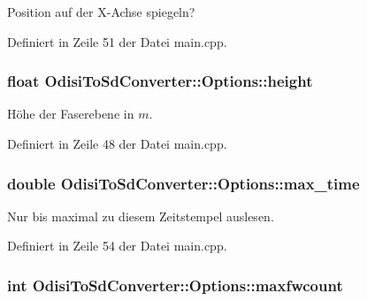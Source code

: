 Position auf der X-\/\-Achse spiegeln? 



Definiert in Zeile 51 der Datei main.\-cpp.

\hypertarget{structOdisiToSdConverter_1_1Options_a9e9609b45b425d128550508772ad69f6}{
\subsubsection[{height}]{\setlength{\rightskip}{0pt plus 5cm}float Odisi\-To\-Sd\-Converter\-::\-Options\-::height}}\label{structOdisiToSdConverter_1_1Options_a9e9609b45b425d128550508772ad69f6}


Höhe der Faserebene in $m$. 



Definiert in Zeile 48 der Datei main.\-cpp.

\hypertarget{structOdisiToSdConverter_1_1Options_afb526c278f5e4273379c0e6345ce01c0}{
\subsubsection[{max\-\_\-time}]{\setlength{\rightskip}{0pt plus 5cm}double Odisi\-To\-Sd\-Converter\-::\-Options\-::max\-\_\-time}}\label{structOdisiToSdConverter_1_1Options_afb526c278f5e4273379c0e6345ce01c0}


Nur bis maximal zu diesem Zeitstempel auslesen. 



Definiert in Zeile 54 der Datei main.\-cpp.

\hypertarget{structOdisiToSdConverter_1_1Options_aca66edaa34e64581ddb68bca902634df}{
\subsubsection[{maxfwcount}]{\setlength{\rightskip}{0pt plus 5cm}int Odisi\-To\-Sd\-Converter\-::\-Options\-::maxfwcount}}\label{structOdisiToSdConverter_1_1Options_aca66edaa34e64581ddb68bca902634df}


